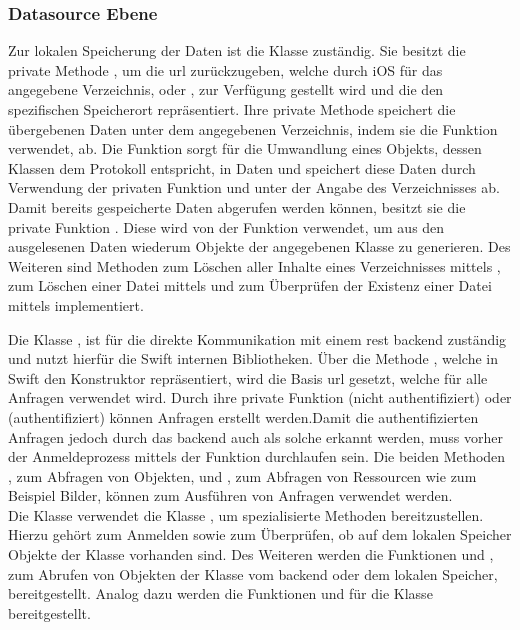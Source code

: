\subsubsection{Datasource Ebene}
Zur lokalen Speicherung der Daten ist die Klasse  zuständig.
Sie besitzt die private Methode , um die \gls{url} zurückzugeben, welche durch iOS für das angegebene Verzeichnis,  oder , zur Verfügung gestellt wird und die den spezifischen Speicherort repräsentiert.
Ihre private Methode  speichert die übergebenen Daten unter dem angegebenen Verzeichnis, indem sie die Funktion  verwendet, ab.
Die Funktion   sorgt für die Umwandlung eines Objekts, dessen Klassen dem  Protokoll entspricht, in Daten und speichert diese Daten durch Verwendung der privaten Funktion  und unter der Angabe des Verzeichnisses ab.
Damit bereits gespeicherte Daten abgerufen werden können, besitzt sie die private Funktion . Diese wird von der Funktion  verwendet, um aus den ausgelesenen Daten wiederum Objekte der angegebenen Klasse zu generieren.
Des Weiteren sind Methoden zum Löschen aller Inhalte eines Verzeichnisses mittels , zum Löschen einer Datei mittels  und zum Überprüfen der Existenz einer Datei mittels  implementiert.

\clearpage

Die Klasse , ist für die direkte Kommunikation mit einem \gls{rest} \gls{backend} zuständig und nutzt hierfür die Swift internen Bibliotheken.
Über die Methode , welche in Swift den Konstruktor repräsentiert, wird die Basis \gls{url} gesetzt, welche für alle Anfragen verwendet wird.
Durch ihre private Funktion  (nicht authentifiziert) oder  (authentifiziert) können Anfragen erstellt werden.Damit die authentifizierten Anfragen jedoch durch das \gls{backend} auch als solche erkannt werden, muss vorher der Anmeldeprozess mittels der Funktion  durchlaufen sein.
Die beiden Methoden , zum Abfragen von Objekten, und , zum Abfragen von Ressourcen wie zum Beispiel Bilder, können zum Ausführen von Anfragen verwendet werden.
\\
Die Klasse  verwendet die Klasse , um spezialisierte Methoden bereitzustellen.
Hierzu gehört  zum Anmelden sowie  zum Überprüfen, ob auf dem lokalen Speicher Objekte der Klasse  vorhanden sind.
Des Weiteren werden die Funktionen  und , zum Abrufen von Objekten der Klasse  vom \gls{backend} oder dem lokalen Speicher, bereitgestellt. Analog dazu werden die Funktionen  und  für die Klasse  bereitgestellt.

